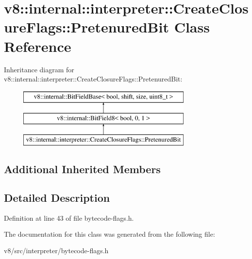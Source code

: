 \hypertarget{classv8_1_1internal_1_1interpreter_1_1CreateClosureFlags_1_1PretenuredBit}{}\section{v8\+:\+:internal\+:\+:interpreter\+:\+:Create\+Closure\+Flags\+:\+:Pretenured\+Bit Class Reference}
\label{classv8_1_1internal_1_1interpreter_1_1CreateClosureFlags_1_1PretenuredBit}
Inheritance diagram for v8\+:\+:internal\+:\+:interpreter\+:\+:Create\+Closure\+Flags\+:\+:Pretenured\+Bit\+:\begin{figure}[H]
\begin{center}
\leavevmode
\includegraphics[height=3.000000cm]{classv8_1_1internal_1_1interpreter_1_1CreateClosureFlags_1_1PretenuredBit}
\end{center}
\end{figure}
\subsection*{Additional Inherited Members}


\subsection{Detailed Description}


Definition at line 43 of file bytecode-\/flags.\+h.



The documentation for this class was generated from the following file\+:\begin{DoxyCompactItemize}
\item 
v8/src/interpreter/bytecode-\/flags.\+h\end{DoxyCompactItemize}
